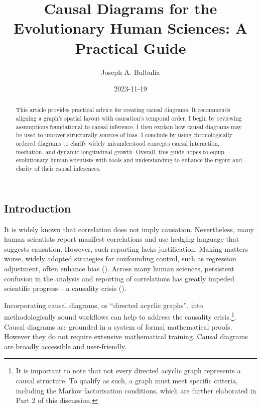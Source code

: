 \documentclass[
  singlecolumn,
  9pt]{article}
\title{Causal Diagrams for the Evolutionary Human Sciences: A Practical
Guide}
\author{Joseph A. Bulbulia}
\affil{%
                  Victoria University of Wellington, New Zealand, School
                  of Psychology, Centre for Applied Cross-Cultural
                  Research
              }
\date{2023-11-19}
\begin{document}
\maketitle
\begin{abstract}
This article provides practical advice for creating causal diagrams. It
recommends aligning a graph's spatial layout with causation's temporal
order. I begin by reviewing assumptions foundational to causal
inference. I then explain how causal diagrams may be used to uncover
structurally sources of bias. I conclude by using chronologically
ordered diagrams to clarify widely misunderstood concepts causal
interaction, mediation, and dynamic longitudinal growth. Overall, this
guide hopes to equip evolutionary human scientists with tools and
understanding to enhance the rigour and clarity of their causal
inferences.
\end{abstract}
\subsection{Introduction}\label{introduction}

It is widely known that correlation does not imply causation.
Nevertheless, many human scientists report manifest correlations and use
hedging language that suggests causation. However, such reporting lacks
justification. Making matters worse, widely adopted strategies for
confounding control, such as regression adjustment, often enhance bias
(). Across many human
sciences, persistent confusion in the analysis and reporting of
correlations has greatly impeded scientific progress -- a causality
crisis ().

Incorporating causal diagrams, or ``directed acyclic graphs'', into
methodologically sound workflows can help to address the causality
crisis.\footnote{It is important to note that not every directed acyclic
  graph represents a causal structure. To qualify as such, a graph must
  meet specific criteria, including the Markov factorisation conditions,
  which are further elaborated in Part 2 of this discussion.}. Causal
diagrams are grounded in a system of formal mathematical proofs. However
they do not require extensive mathematical training. Causal diagrams are
broadly accessible and user-friendly.
\end{document}
